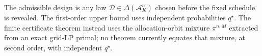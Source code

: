The admissible design is any law \(\mathcal D\in\Delta(\mathcal A_K^n)\) chosen before the fixed schedule is revealed.  The first-order upper bound uses independent probabilities \(q^\star\).  The finite certificate theorem instead uses the allocation-orbit mixture \(\pi^{n,M}\) extracted from an exact grid-LP primal; no theorem currently equates that mixture, at second order, with independent \(q^\star\).